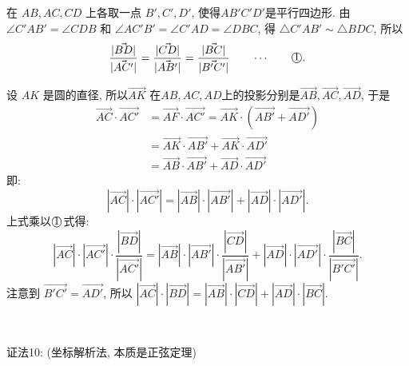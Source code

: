 在 $AB, AC, CD$ 上各取一点 $B',C',D'$, 使得$AB'C'D'$是平行四边形. 由 $\angle C'AB' = \angle CDB$ 和 $\angle AC'B' = \angle C'AD = \angle DBC$, 得 $\triangle C'AB'\sim\triangle BDC$, 所以
\[\frac{|\vec{BD}|}{|\vec{AC'}|} = \frac{|\vec{CD}|}{|\vec{AB'}|} = \frac{|\vec{BC}|}{|\vec{B'C'}|} \qquad\cdots\qquad \raisebox{.5pt}{\textcircled{\raisebox{0pt} {1}}}.\]

设 $AK$ 是圆的直径, 所以$\vec{AK}$ 在$AB,AC,AD$上的投影分别是$\vec{AB},\vec{AC},\vec{AD}$, 于是
\begin{align*}
\vec{AC}\cdot\vec{AC'} &= \vec{AF}\cdot\vec{AC'} = \vec{AK}\cdot(\vec{AB'}+\vec{AD'})\\
&= \vec{AK}\cdot\vec{AB'}+\vec{AK}\cdot\vec{AD'}\\
&= \vec{AB}\cdot\vec{AB'}+\vec{AD}\cdot\vec{AD'}
\end{align*}
即: \[|\vec{AC}|\cdot|\vec{AC'}| = |\vec{AB}|\cdot|\vec{AB'}| + |\vec{AD}|\cdot|\vec{AD'}| .\]
上式乘以$\raisebox{.5pt}{\textcircled{\raisebox{0pt} {1}}}$式得: 
\[|\vec{AC}|\cdot|\vec{AC'}|\cdot\frac{|\vec{BD}|}{|\vec{AC'}|} = |\vec{AB}|\cdot|\vec{AB'}|\cdot\frac{|\vec{CD}|}{|\vec{AB'}|} + |\vec{AD}|\cdot|\vec{AD'}|\cdot\frac{|\vec{BC}|}{|\vec{B'C'}|} .\]
注意到 $\vec{B'C'}=\vec{AD'}$, 所以 $|\vec{AC}|\cdot|\vec{BD}| = |\vec{AB}|\cdot|\vec{CD}|+|\vec{AD}|\cdot|\vec{BC}|$.

~

证法10: (坐标解析法, 本质是正弦定理)
\begin{figure*}[htbp]
\centering
{}
\end{figure*}

